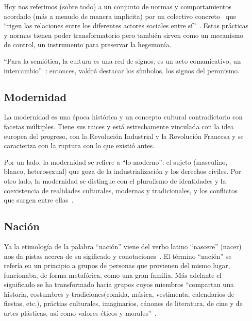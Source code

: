 \documentclass[
10pt, %
a4paper, %
oneside, %
headinclude,footinclude, %
]{scrartcl}
\begin{document}
Hoy nos referimos (sobre todo) a un conjunto de normas y comportamientos acordado (más a menudo de manera implicita) por un colectivo concreto~\autocite[52]{GKS2016} que ``rigen las relaciones entre los diferentes actores sociales entre sí''~\autocite[48]{SzIr2009}.
Estas prácticas y normas tienen poder transformatorio pero también sirven como un mecanismo de control, un instrumento para preservar la hegemonía.

``Para la semiótica, la cultura es una red de signos; es un acto comunicativo, un intercambio''~\autocite[71]{SzIr2009}:
entonces, valdrá destacar los símbolos, los signos del peronismo.

\subsection{Modernidad}

La modernidad es una época histórica y un concepto cultural contradictorio con facetas múltiples.
Tiene sus raices y está estrechamente vinculada con la idea europea del progreso, con la Revolución Industrial y la Revolución Francesa y se caracteriza con la ruptura con lo que existió antes.

Por un lado, la modernidad se refiere a ``lo moderno'': el sujeto (masculino, blanco, heterosexual) que goza de la industrialización y los derechos civiles.
Por otro lado, la modernidad se distingue con el pluralismo de identidades y la coexistencia de realidades culturales, modernas y tradicionales, y los conflictos que surgen entre ellas~\autocite[177]{SzIr2009}.

\subsection{Nación}

Ya la etimología de la palabra ``nación'' viene del verbo latino ``nascere'' (nacer) nos da pistas acerca de su sigificado y conotaciones~\autocite[189]{SzIr2009}.
El término ``nación'' se refería en un principio a grupos de personas que provienen del mismo lugar, funcionaba, de forma metafórica, como una gran familia.
Más adelante el significado se ha transformado hacia grupos cuyos miembros
``compartan una historia, costumbres y tradiciones(comida, música, vestimenta, calendarios de fiestas, etc.), práctias culturales, imaginarios, cánones de literatura, de cine y de artes plásticas, así como valores éticos y morales''~\autocite[190]{SzIr2009}.
\end{document}
